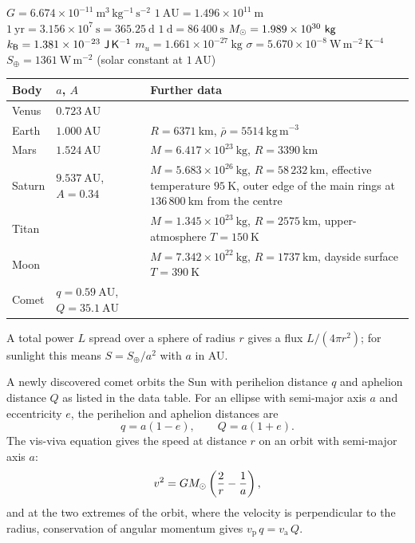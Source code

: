 \begin{given}
$G = 6.674 \times 10^{-11}\ \mathrm{m^3\,kg^{-1}\,s^{-2}}$ \quad
$1\ \mathrm{AU} = 1.496 \times 10^{11}\ \mathrm{m}$ \quad
$1\ \mathrm{yr} = 3.156 \times 10^{7}\ \mathrm{s} = 365.25\ \mathrm{d}$ \quad
$1\ \mathrm{d} = 86\,400\ \mathrm{s}$ \quad
$\Msun = 1.989 \times 10^{30}\ \mathrm{kg}$ \quad
$k_{\mathsf{B}} = 1.381 \times 10^{-23}\ \mathsf{J\,K^{-1}}$ \quad
$m_u = 1.661 \times 10^{-27}\ \mathrm{kg}$ \quad
$\sigma = 5.670 \times 10^{-8}\ \mathrm{W\,m^{-2}\,K^{-4}}$ \quad
$S_\oplus = 1361\ \mathrm{W\,m^{-2}}$ (solar constant at $1\ \mathrm{AU}$)

\vskip6pt
\begin{tabular}{@{}llp{7.2cm}@{}}
\toprule
Body & $a$, $A$ & Further data \\
\midrule
Venus & $0.723\ \mathrm{AU}$ & \\
Earth & $1.000\ \mathrm{AU}$ & $R = 6371\ \mathrm{km}$, $\bar{\rho} = 5514\ \mathrm{kg\,m^{-3}}$ \\
Mars & $1.524\ \mathrm{AU}$ & $M = 6.417 \times 10^{23}\ \mathrm{kg}$, $R = 3390\ \mathrm{km}$ \\
Saturn & $9.537\ \mathrm{AU}$, $A = 0.34$ & $M = 5.683 \times 10^{26}\ \mathrm{kg}$, $R = 58\,232\ \mathrm{km}$, effective temperature $95\ \mathrm{K}$, outer edge of the main rings at $136\,800\ \mathrm{km}$ from the centre \\
Titan & & $M = 1.345 \times 10^{23}\ \mathrm{kg}$, $R = 2575\ \mathrm{km}$, upper-atmosphere $T = 150\ \mathrm{K}$ \\
Moon & & $M = 7.342 \times 10^{22}\ \mathrm{kg}$, $R = 1737\ \mathrm{km}$, dayside surface $T = 390\ \mathrm{K}$ \\
Comet & $q = 0.59\ \mathrm{AU}$, $Q = 35.1\ \mathrm{AU}$ & \\
\bottomrule
\end{tabular}

\vskip4pt
{\footnotesize A total power $L$ spread over a sphere of radius $r$ gives a flux $L/(4\pi r^2)$; for sunlight this means $S = S_\oplus/a^2$ with $a$ in AU.}
\end{given}



A newly discovered comet orbits the Sun with perihelion distance $q$ and aphelion distance $Q$ as listed in the data table.
For an ellipse with semi-major axis $a$ and eccentricity $e$, the perihelion and aphelion distances are
\[
  q = a(1 - e), \qquad Q = a(1 + e).
\]
The vis-viva equation gives the speed at distance $r$ on an orbit with semi-major axis $a$:
\[
  v^2 = G M_{\odot} \left( \frac{2}{r} - \frac{1}{a} \right),
\]
and at the two extremes of the orbit, where the velocity is perpendicular to the radius, conservation of angular momentum gives $v_{\mathrm{p}}\, q = v_{\mathrm{a}}\, Q$.

